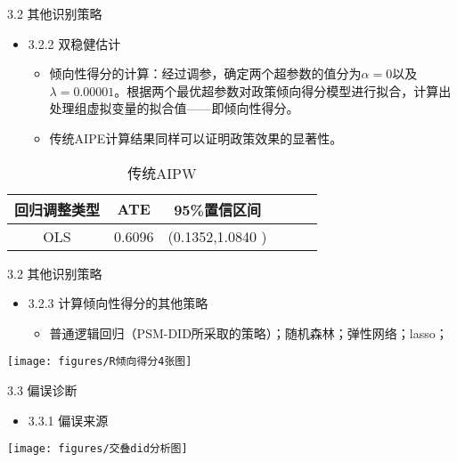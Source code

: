 \documentclass{beamer}%
\begin{document}
\begin{frame}[t]{\large 3.2 其他识别策略}
\begin{itemize}
  \item 3.2.2 双稳健估计
  \begin{itemize}
    \item 倾向性得分的计算：经过调参，确定两个超参数的值分为$\alpha=0$以及$\lambda=0.00001$。根据两个最优超参数对政策倾向得分模型进行拟合，计算出处理组虚拟变量的拟合值——即倾向性得分。
    \item 传统AIPE计算结果同样可以证明政策效果的显著性。
  \end{itemize}
\end{itemize}
\begin{table}
\centering
\caption{传统AIPW}
\begin{tabular}{cccccc}
   \toprule
   回归调整类型 & ATE & 95\%置信区间 \\
   \midrule
   OLS & 0.6096 & (0.1352,1.0840 )  \\
   \bottomrule
\end{tabular}
\end{table}
\end{frame}


\begin{frame}[t]{\large 3.2 其他识别策略}
\begin{itemize}
  \item 3.2.3 计算倾向性得分的其他策略
  \begin{itemize}
    \item 普通逻辑回归（PSM-DID所采取的策略）；随机森林；弹性网络；lasso；
  \end{itemize}
\end{itemize}
\vspace{-0.9cm} %
\begin{center}
	\texttt{[image: figures/R倾向得分4张图]}
\end{center}
\end{frame}


\begin{frame}[t]{\large 3.3 偏误诊断}
\begin{itemize}
  \item 3.3.1 偏误来源
\end{itemize}
\vspace{-0.4cm} %
\begin{center}
	\texttt{[image: figures/交叠did分析图]}
\end{center}
\end{frame}
\end{document}
